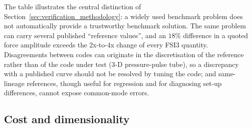 The table illustrates the central distinction of Section~\ref{sec:verification_methodology}: a widely used benchmark problem does not automatically provide a trustworthy benchmark solution.
The same problem can carry several published ``reference values'', and an $18\%$ difference in a quoted force amplitude exceeds the 2x-to-4x change of every FSI3 quantity.
Disagreements between codes can originate in the discretisation of the reference rather than of the code under test (3-D pressure-pulse tube), so a discrepancy with a published curve should not be resolved by tuning the code; and same-lineage references, though useful for regression and for diagnosing set-up differences, cannot expose common-mode errors.

\subsection{Cost and dimensionality}\label{sec:cost}


